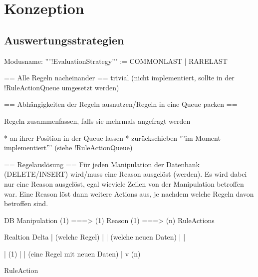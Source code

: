 \chapter{Konzeption}







\section{Auswertungsstrategien}
Modusname: '''!EvaluationStrategy''' := COMMONLAST | RARELAST

== Alle Regeln nacheinander ==
trivial (nicht implementiert, sollte in der !RuleActionQueue umgesetzt werden)

== Abhängigkeiten der Regeln ausnutzen/Regeln in eine Queue packen ==

Regeln zusammenfassen, falls sie mehrmals angefragt werden

 * an ihrer Position in der Queue lassen
 * zurückschieben '''im Moment implementiert''' (siehe !RuleActionQueue)

== Regelauslösung ==
Für jeden Manipulation der Datenbank (DELETE/INSERT) wird/muss eine Reason ausgelöst (werden). Es wird dabei nur eine Reason ausgelöst, egal wieviele Zeilen von der Manipulation betroffen war. Eine Reason löst dann weitere Actions aus, je nachdem welche Regeln davon betroffen sind.


DB Manipulation  (1) ===> (1) Reason (1) ===> (n) RuleActions

           Realtion                     Delta
                                          |
(welche Regel) |                          | (welche neuen Daten)
               |                          |

                          | (1)
                          |
                          | (eine Regel mit neuen Daten)
                          |
                          v (n)

                      RuleAction


